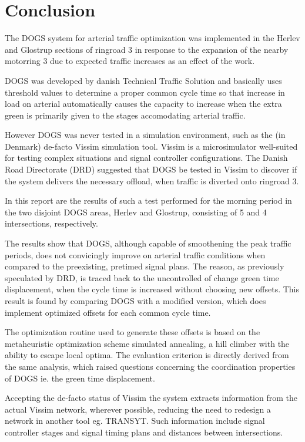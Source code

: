 \section{Conclusion}
\label{conclusion}

The DOGS system for arterial traffic optimization was implemented in the Herlev and Glostrup sections of ringroad 3 in response to the expansion of the nearby motorring 3 due to expected traffic increases as an effect of the work.

DOGS was developed by danish Technical Traffic Solution and basically uses threshold values to determine a proper common cycle time so that increase in load on arterial automatically causes the capacity to increase when the extra green is primarily given to the stages accomodating arterial traffic.

However DOGS was never tested in a simulation environment, such as the (in Denmark) de-facto Vissim simulation tool. Vissim is a microsimulator well-suited for testing complex situations and signal controller configurations.
The Danish Road Directorate (DRD) suggested that DOGS be tested in Vissim to discover if the system delivers the necessary offload, when traffic is diverted onto ringroad 3.

In this report are the results of such a test performed for the morning period in the two disjoint DOGS areas, Herlev and Glostrup, consisting of 5 and 4 intersections, respectively. 

The results show that DOGS, although capable of smoothening the peak traffic periods, does not convicingly improve on arterial traffic conditions when compared to the preexisting, pretimed signal plans. The reason, as previously speculated by DRD, is traced back to the uncontrolled of change green time displacement, when the cycle time is increased without choosing new offsets. This result is found by comparing DOGS with a modified version, which does implement optimized offsets for each common cycle time.

The optimization routine used to generate these offsets is based on the metaheuristic optimization scheme simulated annealing, a hill climber with the ability to escape local optima. The evaluation criterion is directly derived from the same analysis, which raised questions concerning the coordination properties of DOGS ie. the green time displacement.

Accepting the de-facto status of Vissim the system extracts information from the actual Vissim network, wherever possible, reducing the need to redesign a network in another tool eg. TRANSYT. Such information include signal controller stages and signal timing plans and distances between intersections.

